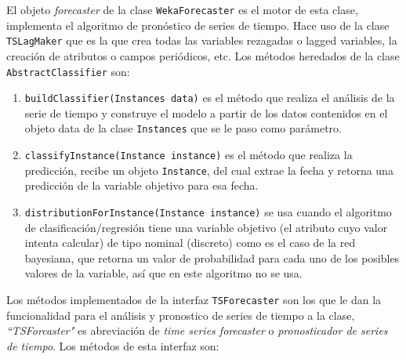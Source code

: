 El objeto \textit{forecaster} de la clase \texttt{WekaForecaster} es el motor de esta clase, implementa el algoritmo de pronóstico de series de tiempo. Hace uso de la clase \texttt{TSLagMaker} que es la que crea todas las variables rezagadas o lagged variables, la creación de atributos o campos periódicos, etc.
Los métodos heredados de la clase \texttt{AbstractClassifier} son:
\begin{enumerate}
	\item \texttt{buildClassifier(Instances data)} es el método que realiza el análisis de la serie de tiempo y construye el modelo 		a partir de los datos contenidos en el objeto data de la clase \texttt{Instances} que se le paso como parámetro.
	
	\item \texttt{classifyInstance(Instance instance)} es el método que realiza la predicción, recibe un objeto \texttt{Instance}, del cual 	extrae la fecha y retorna una predicción de la variable objetivo para esa fecha.
	
	\item  \texttt{distributionForInstance(Instance instance)} se usa cuando el algoritmo de clasificación/regresión tiene una 				variable objetivo (el atributo cuyo valor intenta calcular) de tipo nominal (discreto) como es el caso de la red bayesiana, que 		retorna un valor de probabilidad para cada uno de los posibles valores de la variable, así que en este algoritmo no se usa.
\end{enumerate}
Los métodos implementados de la interfaz \texttt{TSForecaster} son los que le dan la funcionalidad para el análisis y pronostico de series de tiempo a la clase, \textit{``TSForcaster"} es abreviación de \textit{time series forecaster} o \textit{pronosticador de series de tiempo}. Los métodos de esta interfaz son: 
